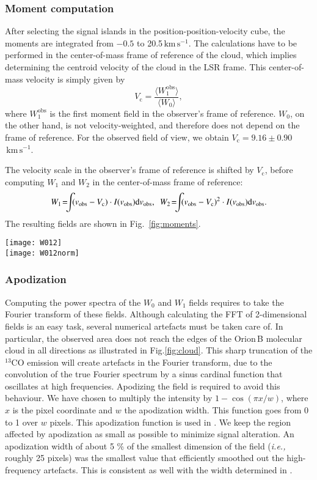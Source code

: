 \documentclass[structabstract]{aa}
\newcommand{\ie}{{\em i.e.,}}
\newcommand{\emm}[1]{\ensuremath{#1}}
\newcommand{\emr}[1]{\emm{\mathrm{#1}}}
\newcommand{\unit}[1]{\emr{\,#1}}
\newcommand{\kms}{\unit{km\,s^{-1}}}
\newcommand{\FigMoments}{%
  \begin{figure*}
    \centering
    \texttt{[image: W012]} \\
    \texttt{[image: W012norm]}
    \caption{Top: maps of the $^{13}$CO($J=1-0$) field moments in the cloud's frame of reference. Bottom: maps of the physical quantities directly derived from each field, with the centroid velocity being simply $W_1/W_0$, and the FWHM velocity dispersion given by $2\sqrt{2\ln(2)}\sqrt{W_2/W_0}$ -- the normalization of the FWHM corresponds to that of a field with purely Gaussian line profiles.}
    \label{fig:moments}
  \end{figure*}}
\begin{document}
\subsubsection{Moment computation}
After selecting the signal islands in the position-position-velocity cube, the moments are integrated from $-0.5$ to 20.5\kms{}. The calculations have to be performed in the center-of-mass frame of reference of the cloud, which implies determining the centroid velocity of the cloud in the LSR frame. This center-of-mass velocity is simply given by
\begin{equation}
V_\emr{c} = \frac{\langle W_1^\emr{obs} \rangle}{\langle W_0 \rangle},
\end{equation}
where $W_1^\emr{obs}$ is the first moment field in the observer's frame of reference. $W_0$, on the other hand, is not velocity-weighted, and therefore does not depend on the frame of reference. For the observed field of view, we obtain $V_\emr{c} = 9.16 \pm 0.90$\kms{}.

The velocity scale in the observer's frame of reference is shifted by $V_\emr{c}$, before computing $W_1$ and $W_2$ in the center-of-mass frame of reference:
\begin{equation}
W_{1}\! = \!\!\!\int\!\! (v_\emr{obs}-V_\emr{c}) \cdot I(v_\emr{obs}) \mathrm{d}v_\emr{obs}, \enskip W_{2} \!= \!\!\!\int\!\! (v_\emr{obs}-V_\emr{c})^2\cdot I(v_\emr{obs}) \mathrm{d}v_\emr{obs}.
\end{equation}
The resulting fields are shown in Fig.~\ref{fig:moments}.

\FigMoments{}

\subsubsection{Apodization}

Computing the power spectra of the $W_0$ and $W_1$ fields requires to take the Fourier transform of these fields. Although calculating the FFT of 2-dimensional fields is an easy task, several numerical artefacts must be taken care of. In particular, the observed area does not reach the edges of the Orion\,B molecular cloud in all directions as illustrated in Fig.\ref{fig:cloud}. This sharp truncation of the $^{13}$CO emission will create artefacts in the Fourier transform, due to the convolution of the true Fourier spectrum by a sinus cardinal function that oscillates at high frequencies. Apodizing the field is required to avoid this behaviour. We have chosen to multiply the intensity by $1 - \cos(\pi x/w)$, where $x$ is the pixel coordinate and $w$ the apodization width. This function goes from 0 to 1 over $w$ pixels. This apodization function is used in \citet{martin15}. We keep the region affected by apodization as small as possible to minimize signal alteration. An apodization width of about 5 \% of the smallest dimension of the field (\ie{} roughly 25 pixels) was the smallest value that efficiently smoothed out the high-frequency artefacts. This is consistent as well with the width determined in \citet{martin15}.
\end{document}
